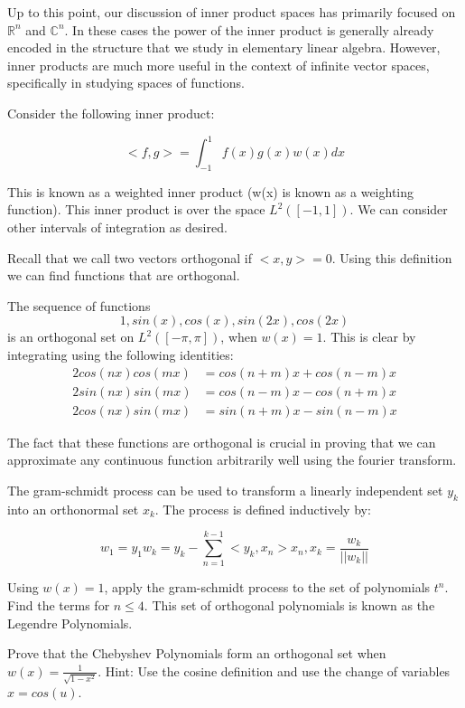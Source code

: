 \label{OrthoPoly}


Up to this point, our discussion of inner product spaces has primarily focused on $\mathbb{R}^{n}$ and $\mathbb{C}^{n}$. In these cases the power of the inner product is generally already encoded in the structure that we study in elementary linear algebra. However, inner products are much more useful in the context of infinite vector spaces, specifically in studying spaces of functions.

Consider the following inner product:

\[
<f,g> = \int_{-1}^1 f(x) g(x) w(x) dx
\]

This is known as a weighted inner product (w(x) is known as a weighting function). This inner product is over the space $L^2([-1,1])$. We can consider other intervals of integration as desired.

Recall that we call two vectors orthogonal if $<x,y> = 0$. Using this definition we can find functions that are orthogonal.

\begin{example}
The sequence of functions
\[
1,sin(x),cos(x),sin(2x),cos(2x)
\]
is an orthogonal set on $L^2([-\pi,\pi])$, when $w(x) = 1$. This is clear by integrating using the following identities:
\begin{align*}
2 cos(nx)cos(mx) &= cos(n+m)x + cos(n-m)x \\
2 sin(nx)sin(mx) &= cos(n-m)x - cos(n+m)x \\
2 cos(nx)sin(mx) &= sin(n+m)x - sin(n-m)x
\end{align*}

The fact that these functions are orthogonal is crucial in proving that we can approximate any continuous function arbitrarily well using the fourier transform.
\end{example}

\begin{problem}
The gram-schmidt process can be used to transform a linearly independent set $y_k$ into an orthonormal set $x_k$. The process is defined inductively by:

\[
w_1 = y_1
w_k = y_k - \sum_{n=1}^{k-1} <y_k,x_n>x_n, x_k = \frac{w_k}{||w_k||}
\]

Using $w(x) = 1$, apply the gram-schmidt process to the set of polynomials $t^n$. Find the terms for $n \leq 4$. This set of orthogonal polynomials is known as the Legendre Polynomials.
\end{problem}
\begin{problem}
Prove that the Chebyshev Polynomials form an orthogonal set when $w(x) = \frac{1}{\sqrt{1-x^2}}$. Hint: Use the cosine definition and use the change of variables $x = cos(u)$.
\end{problem}


